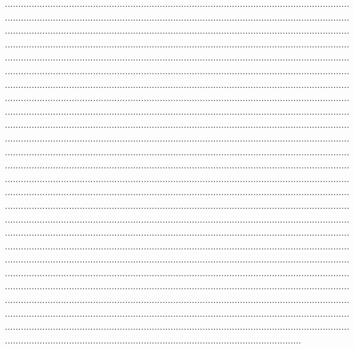 ........................................................................................................................................................................................................................................................................................................................................................................................................................................................................................................................................................................................................................................................................................................................................................................................................................................................................................................................................................................................................................................................................................................................................................................................................................................................................................................................................................................................................................................................................................................................................................................................................................................................................................................................................................................................................................................................................................................................................................................................................................................................................................................................................................................................................................................................................................................................................................................................................................................................................................................................................................................................................................................................................................................................................................................................................................................................................................................................................................................................................................................................................................................................................................................................................................................................................................................................................................................................................................................................................